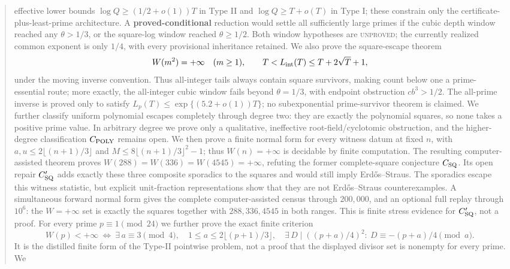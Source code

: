 \documentclass[10pt,reqno]{amsart}
\theoremstyle{definition}
\newcommand{\1}{\mathbf 1}
\begin{document}
\begin{abstract}
effective lower bounds $\log Q\geq(1/2+o(1))T$ in Type II and
$\log Q\geq T+o(T)$ in Type I; these constrain only the
certificate-plus-least-prime architecture.  A \textbf{proved-conditional}
reduction would settle all sufficiently large primes if the cubic depth
window reached any $\theta>1/3$, or the square-log window reached
$\theta\geq1/2$.  Both window hypotheses are \textsc{unproved}; the
currently realized common exponent is only $1/4$, with every provisional
inheritance retained.  We also prove the
square-escape theorem
\[
 W(m^2)=+\infty\quad(m\geq1),\qquad
 T<L_{\rm int}(T)\leq T+2\sqrt T+1,
\]
under the moving inverse convention.  Thus all-integer tails always contain
square survivors, making count below one a prime-essential route; more
exactly, the all-integer cubic window fails beyond $\theta=1/3$, with
endpoint obstruction $cb^3>1/2$.  The all-prime inverse is proved only to
satisfy $L_p(T)\leq\exp\{(5.2+o(1))T\}$; no subexponential prime-survivor
theorem is claimed.  We further classify uniform polynomial escapes
completely through degree two: they are exactly the polynomial squares, so
none takes a positive prime value.  In arbitrary degree we prove only a
qualitative, ineffective root-field/cyclotomic obstruction, and the higher-
degree classification $C_{\rm POLY}$ remains open.  We then prove a finite
normal form for every witness datum at fixed $n$, with
$a,u\leq2\lfloor(n+1)/3\rfloor$ and
$M\leq8\lfloor(n+1)/3\rfloor^2-1$; thus $W(n)=+\infty$ is decidable by
finite computation.  The resulting computer-assisted theorem proves
$W(288)=W(336)=W(4545)=+\infty$, refuting the former complete-square
conjecture $C_{\rm SQ}$.  Its open repair $C_{\rm SQ}'$ adds exactly these
three composite sporadics to the squares and would still imply
Erd\H{o}s--Straus.  The sporadics escape this witness statistic, but explicit
unit-fraction representations show that they are not Erd\H{o}s--Straus
counterexamples.  A simultaneous forward normal form gives the complete
computer-assisted census through $200{,}000$, and an optional full replay
through $10^6$: the $W=+\infty$ set is exactly the squares together with
$288,336,4545$ in both ranges.  This is finite stress evidence for
$C_{\rm SQ}'$, not a proof.  For every prime $p\equiv1\pmod {24}$ we further
prove the exact finite criterion
\[
 W(p)<+\infty\ \Longleftrightarrow\
 \exists\,a\equiv3\pmod4,\quad
 1\leq a\leq2\lfloor(p+1)/3\rfloor,\quad
 \exists\,D\mid((p+a)/4)^2:\ D\equiv-(p+a)/4\pmod a.
\]
It is the distilled finite form of the Type-II pointwise problem, not a
proof that the displayed divisor set is nonempty for every prime.  We

\end{abstract}
\end{document}
